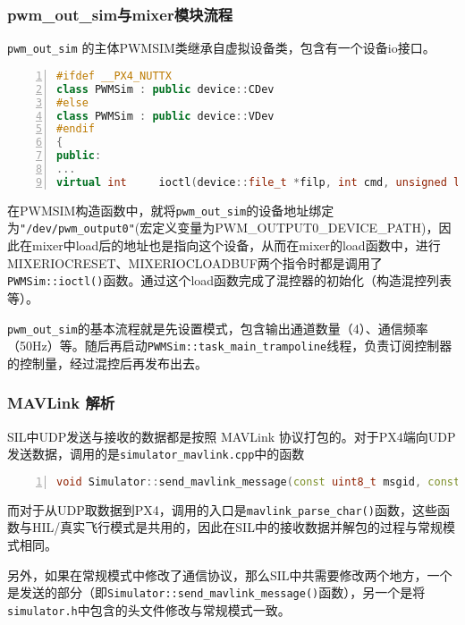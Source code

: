\subsubsection{pwm_out_sim与mixer模块流程}
\texttt{pwm_out_sim} 的主体PWMSIM类继承自虚拟设备类，包含有一个设备io接口。
\begin{lstlisting}[language=c++,numbers=left,firstnumber = 1,breaklines = true,numberstyle=\tiny,keywordstyle=\color{blue!70},commentstyle=\color{red!50!green!50!blue!50},frame=shadowbox, rulesepcolor=\color{red!20!green!20!blue!20}]
#ifdef __PX4_NUTTX
class PWMSim : public device::CDev
#else
class PWMSim : public device::VDev
#endif
{
public:
...
virtual int     ioctl(device::file_t *filp, int cmd, unsigned long arg);
\end{lstlisting}
在PWMSIM构造函数中，就将\texttt{pwm_out_sim}的设备地址绑定为\texttt{"/dev/pwm_output0"}(宏定义变量为PWM_OUTPUT0_DEVICE_PATH)，因此在mixer中load后的地址也是指向这个设备，从而在mixer的load函数中，进行MIXERIOCRESET、MIXERIOCLOADBUF两个指令时都是调用了\texttt{PWMSim::ioctl()}函数。通过这个load函数完成了混控器的初始化（构造混控列表等）。

\texttt{pwm_out_sim}的基本流程就是先设置模式，包含输出通道数量（4）、通信频率（50Hz）等。随后再启动\texttt{PWMSim::task_main_trampoline}线程，负责订阅控制器的控制量，经过混控后再发布出去。

\subsubsection{MAVLink 解析}

SIL中UDP发送与接收的数据都是按照 MAVLink 协议打包的。对于PX4端向UDP发送数据，调用的是\texttt{simulator_mavlink.cpp}中的函数
\begin{lstlisting}[language=c++,numbers=left,firstnumber = 1,breaklines = true,numberstyle=\tiny,keywordstyle=\color{blue!70},commentstyle=\color{red!50!green!50!blue!50},frame=shadowbox, rulesepcolor=\color{red!20!green!20!blue!20}]
	void Simulator::send_mavlink_message(const uint8_t msgid, const void *msg, uint8_t component_ID)
\end{lstlisting}

而对于从UDP取数据到PX4，调用的入口是\texttt{mavlink_parse_char()}函数，这些函数与HIL/真实飞行模式是共用的，因此在SIL中的接收数据并解包的过程与常规模式相同。

另外，如果在常规模式中修改了通信协议，那么SIL中共需要修改两个地方，一个是发送的部分（即\texttt{Simulator::send_mavlink_message()}函数），另一个是将\texttt{simulator.h}中包含的头文件修改与常规模式一致。

